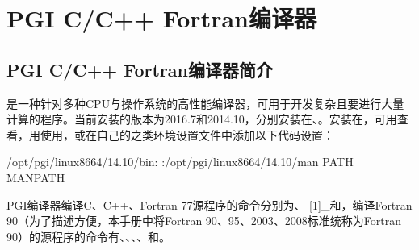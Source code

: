 \documentclass[a4paper,12pt,english]{sphinxmanual}
\begin{document}
\sphinxstepscope


\section{PGI C/C++ Fortran编译器}
\label{\detokenize{compiler/pgi:pgi-c-c-fortran}}\label{\detokenize{compiler/pgi::doc}}

\subsection{PGI C/C++ Fortran编译器简介}
\label{\detokenize{compiler/pgi:id1}}
\sphinxAtStartPar
{}是一种针对多种CPU与操作系统的高性能编译器，可用于开发复杂且要进行大量计算的程序。当前安装的版本为2016.7和2014.10，分别安装在、。安装在，可用查看，用使用，或在自己的之类环境设置文件中添加以下代码设置：

\begin{sphinxVerbatim}[commandchars=\\\{\}]
/opt/pgi/linux86\PYGZhy{}64/14.10/bin:
:/opt/pgi/linux86\PYGZhy{}64/14.10/man
 PATH MANPATH
\end{sphinxVerbatim}

\sphinxAtStartPar
PGI编译器编译C、C++、Fortran 77源程序的命令分别为、 {[}1{]}\_和，编译Fortran 90（为了描述方便，本手册中将Fortran 90、95、2003、2008标准统称为Fortran 90）的源程序的命令有、、、、和。
\end{document}
